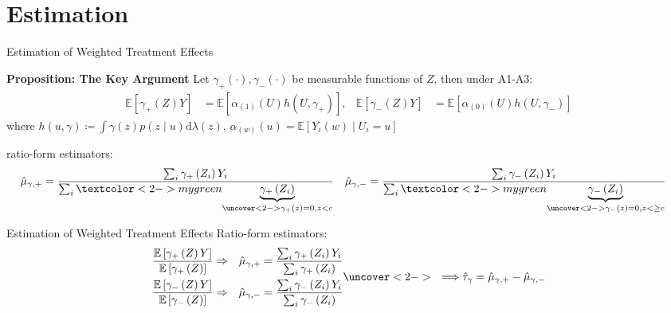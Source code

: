 \section{Estimation}

 \frame{\sectionpage}

    \begin{frame}{Estimation of Weighted Treatment Effects}
        \begin{block}{\textbf{Proposition: The Key Argument}}
            \small
            Let $\gamma_{+}(\cdot),\gamma_{-}(\cdot)$ be measurable functions of $Z$, then under A1-A3:
            \begin{align*}
                \mathbb{E}\left[\gamma_{+}\left(Z\right)Y\right]&=\mathbb{E}\left[\alpha_{\left(1\right)}\left(U\right)h\left(U,\gamma_{+}\right)\right], & \mathbb{E}\left[\gamma_{-}\left(Z\right)Y\right]&=\mathbb{E}\left[\alpha_{\left(0\right)}\left(U\right)h\left(U,\gamma_{-}\right)\right]
            \end{align*}
            where $h\left(u,\gamma\right)\coloneqq\int\gamma\left(z\right)p\left(z\mid u\right)\mathrm{d}\lambda\left(z\right)$, $\alpha_{\left(w\right)}\left(u\right)=\mathbb{E}\left[Y_{i}\left(w\right)\mid U_{i}=u\right]$
        \end{block}

        \vspace*{15pt}
        ratio-form estimators:
        \begin{align*}
            \hat{\mu}_{\gamma,+} &= \frac{\sum_i \gamma_+\left(Z_i\right)Y_i}{\sum_i {\textcolor<2->{mygreen}{\underbrace{\gamma_+\left(Z_i\right)}_{\uncover<2->{\gamma_+(z)=0,z<c}}}} } & \hat{\mu}_{\gamma,-} &= \frac{\sum_i \gamma_-\left(Z_i\right)Y_i}{\sum_i \textcolor<2->{mygreen}{\underbrace{\gamma_-\left(Z_i\right)}_{\uncover<2->{\gamma_-(z)=0,z<\geq c}} } }
        \end{align*}

    \end{frame}

    \begin{frame}{Estimation of Weighted Treatment Effects}
        Ratio-form estimators:
        $$
        \begin{aligned}
            \frac{\mathbb{E}\left[\gamma_{+}\left(Z\right)Y\right]}{\mathbb{E}\left[\gamma_{+}\left(Z\right)\right]}& \Rightarrow & \hat{\mu}_{\gamma,+} &= \frac{\sum_i \gamma_+\left(Z_i\right)Y_i}{\sum_i \gamma_+\left(Z_i\right) } \\
            \frac{\mathbb{E}\left[\gamma_{-}\left(Z\right)Y\right]}{\mathbb{E}\left[\gamma_{-}\left(Z\right)\right]}& \Rightarrow & \hat{\mu}_{\gamma,-} &= \frac{\sum_i \gamma_-\left(Z_i\right)Y_i}{\sum_i \gamma_-\left(Z_i\right) } 
        \end{aligned} \uncover<2->{\ \ \Longrightarrow \hat{\tau}_{\gamma}=\hat{\mu}_{\gamma,+}-\hat{\mu}_{\gamma,-}}
        $$

    \end{frame}


